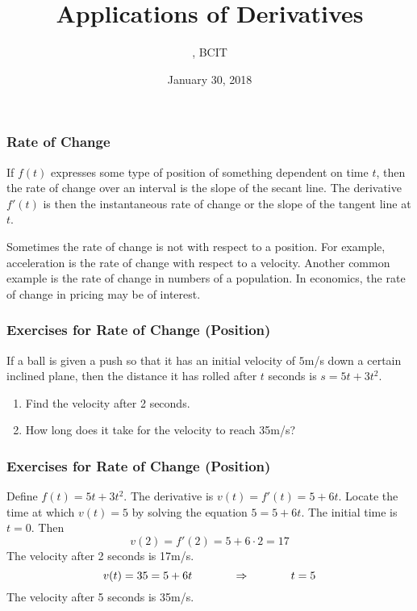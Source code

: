 \documentclass[xcolor=dvipsnames]{beamer}
\title{Applications of Derivatives}
\subtitle{{\CourseNumber}, BCIT}
\author{\CourseName}
\date{January 30, 2018}
\begin{document}
\begin{frame}
  \titlepage
\end{frame}

\begin{frame}
  \frametitle{Rate of Change}
If $f(t)$ expresses some type of position of something dependent on
time $t$, then the rate of change over an interval is the slope of the
secant line. The derivative $f'(t)$ is then the instantaneous rate of
change or the slope of the tangent line at $t$. 

\bigskip

Sometimes the rate of change is not with respect to a position. For
example, acceleration is the rate of change with respect to a
velocity. Another common example is the rate of change in numbers of a
population. In economics, the rate of change in pricing may be of
interest.
\end{frame}

\begin{frame}
  \frametitle{Exercises for Rate of Change (Position)}
If a ball is given a push so that it has an initial velocity of $5$m/s
down a certain inclined plane, then the distance it has rolled after
$t$ seconds is $s=5t+3t^{2}$.
  \begin{enumerate}
  \item<1-> Find the velocity after 2 seconds.
  \item<2-> How long does it take for the velocity to reach 35m/s?
  \end{enumerate}
\end{frame}

\begin{frame}
  \frametitle{Exercises for Rate of Change (Position)}
Define $f(t)=5t+3t^{2}$. The derivative is $v(t)=f'(t)=5+6t$. Locate
the time at which $v(t)=5$ by solving the equation $5=5+6t$. The
initial time is $t=0$. Then
\begin{equation}
  \label{eq:airaiwie}
  v(2)=f'(2)=5+6\cdot{}2=17
\end{equation}
The velocity after 2 seconds is 17m/s.
\begin{equation}
  \label{eq:zeidieba}
  v(t)=35=5+6t\hspace{.5in}\Rightarrow\hspace{.5in}t=5
\end{equation}
The velocity after 5 seconds is 35m/s.
\end{frame}
\end{document}
